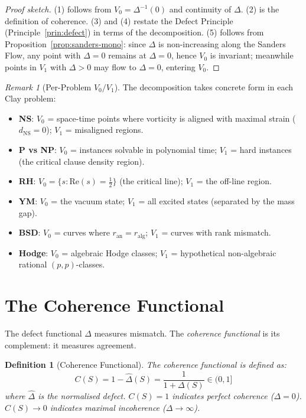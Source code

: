 \documentclass[12pt, openany]{book}
\newtheorem{definition}[theorem]{Definition}
\theoremstyle{remark}
\newtheorem{remark}[theorem]{Remark}
\begin{document}
\begin{proof}[Proof sketch]
(1) follows from $V_0 = \Delta^{-1}(0)$ and continuity of $\Delta$. (2) is
the definition of coherence. (3) and (4) restate the Defect Principle
(Principle~\ref{prin:defect}) in terms of the decomposition. (5) follows from
Proposition~\ref{prop:sanders-mono}: since $\Delta$ is non-increasing along the
Sanders Flow, any point with $\Delta = 0$ remains at $\Delta = 0$, hence $V_0$
is invariant; meanwhile points in $V_1$ with $\Delta > 0$ may flow to $\Delta = 0$,
entering $V_0$.
\end{proof}

\begin{remark}[Per-Problem $V_0 / V_1$]
The decomposition takes concrete form in each Clay problem:
\begin{itemize}
  \item \textbf{NS}: $V_0$ = space-time points where vorticity is aligned with
        maximal strain ($d_{\mathrm{NS}} = 0$); $V_1$ = misaligned regions.
  \item \textbf{P vs NP}: $V_0$ = instances solvable in polynomial time;
        $V_1$ = hard instances (the critical clause density region).
  \item \textbf{RH}: $V_0 = \{s : \mathrm{Re}(s) = \frac{1}{2}\}$ (the critical line);
        $V_1$ = the off-line region.
  \item \textbf{YM}: $V_0$ = the vacuum state; $V_1$ = all excited states
        (separated by the mass gap).
  \item \textbf{BSD}: $V_0$ = curves where $r_{\mathrm{an}} = r_{\mathrm{alg}}$;
        $V_1$ = curves with rank mismatch.
  \item \textbf{Hodge}: $V_0$ = algebraic Hodge classes; $V_1$ = hypothetical
        non-algebraic rational $(p,p)$-classes.
\end{itemize}
\end{remark}


\section{The Coherence Functional}
\label{sec:coherence-functional}

The defect functional $\Delta$ measures mismatch. The \emph{coherence functional}
is its complement: it measures agreement.

\begin{definition}[Coherence Functional]\label{def:coherence-func}
The \emph{coherence functional} is defined as:
\[
  \boxed{C(S) = 1 - \hat{\Delta}(S) = \frac{1}{1 + \Delta(S)} \in (0, 1]}
\]
where $\hat{\Delta}$ is the normalised defect. $C(S) = 1$ indicates perfect
coherence ($\Delta = 0$). $C(S) \to 0$ indicates maximal incoherence
($\Delta \to \infty$).
\end{definition}
\end{document}
